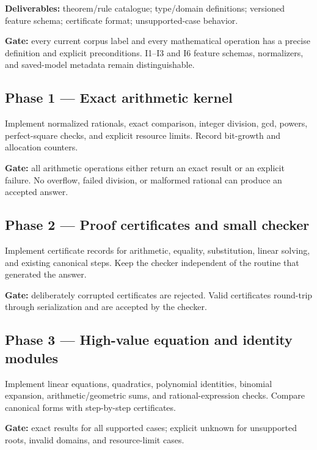 \documentclass[
  10pt,
]{article}
\begin{document}
\textbf{Deliverables:} theorem/rule catalogue; type/domain definitions;
versioned feature schema; certificate format; unsupported-case behavior.

\textbf{Gate:} every current corpus label and every mathematical
operation has a precise definition and explicit preconditions. I1--I3
and I6 feature schemas, normalizers, and saved-model metadata remain
distinguishable.

\subsection{Phase 1 --- Exact arithmetic
kernel}\label{phase-1-exact-arithmetic-kernel}

Implement normalized rationals, exact comparison, integer division, gcd,
powers, perfect-square checks, and explicit resource limits. Record
bit-growth and allocation counters.

\textbf{Gate:} all arithmetic operations either return an exact result
or an explicit failure. No overflow, failed division, or malformed
rational can produce an accepted answer.

\subsection{Phase 2 --- Proof certificates and small
checker}\label{phase-2-proof-certificates-and-small-checker}

Implement certificate records for arithmetic, equality, substitution,
linear solving, and existing canonical steps. Keep the checker
independent of the routine that generated the answer.

\textbf{Gate:} deliberately corrupted certificates are rejected. Valid
certificates round-trip through serialization and are accepted by the
checker.

\subsection{Phase 3 --- High-value equation and identity
modules}\label{phase-3-high-value-equation-and-identity-modules}

Implement linear equations, quadratics, polynomial identities, binomial
expansion, arithmetic/geometric sums, and rational-expression checks.
Compare canonical forms with step-by-step certificates.

\textbf{Gate:} exact results for all supported cases; explicit unknown
for unsupported roots, invalid domains, and resource-limit cases.
\end{document}
